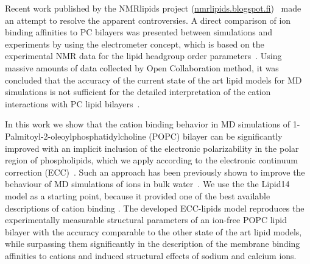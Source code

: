 \documentclass[aip,jcp,twocolumn]{revtex4}
\begin{document}
Recent work published by the NMRlipids project (\url{nmrlipids.blogspot.fi})~\cite{catte16}
made an attempt to resolve the apparent controversies. A direct comparison of
ion binding affinities to PC bilayers was presented between simulations and
experiments by using the electrometer concept, which is based on the experimental NMR data
for the lipid headgroup order parameters~\cite{seelig87}.
Using massive amounts of data collected by Open Collaboration method, it was concluded
that the accuracy of the current state of the art lipid models for MD
simulations is not sufficient for the detailed interpretation of the cation
interactions with PC lipid bilayers~\cite{catte16}.




In this work we show that the cation binding behavior
in MD simulations of 1-Palmitoyl-2-oleoylphosphatidylcholine (POPC) bilayer can be significantly 
improved with an implicit inclusion of the electronic polarizability
in the polar region of phospholipids,
which we apply according to the 
electronic continuum correction (ECC)~\cite{leontyev11}.
Such an approach has been previously shown to improve the behaviour of
MD simulations of ions in bulk water~\cite{jungwirth17-new-paper-to-be-published,Pluharova2014,kohagen14,kohagen16}. 
We use the the Lipid14 model \cite{dickson14} as a starting point,
because it provided one of the best available descriptions of cation binding \cite{catte16}.
The developed ECC-lipids model reproduces the experimentally
measurable structural parameters of an ion-free POPC lipid bilayer with the 
accuracy comparable to the other state of the art lipid models, while surpassing
them significantly in the description of the membrane binding affinities to cations and induced
structural effects of sodium and calcium ions.


\end{document}
